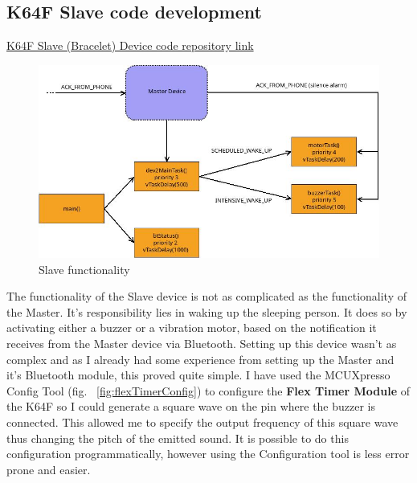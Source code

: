 \documentclass[12pt,a4paper]{article}
\begin{document}
   \subsection{K64F Slave code development}
   \href{https://github.com/zedd-1983/project_dev2/tree/Bluetooth}{K64F Slave (Bracelet) Device code repository link}\\
   
   
   \begin{figure}[h]
    \centering
    \includegraphics[width=\textwidth]{dev2_functionality.jpg}
    \caption{Slave functionality}
    \label{fig:dev2Func}
   \end{figure}
   
   The functionality of the Slave device is not as complicated as the functionality of the Master. It's responsibility lies in waking up the sleeping person. It does so by activating either a buzzer or a vibration motor, based on the notification it receives from the Master device via Bluetooth. 
   Setting up this device wasn't as complex and as I already had some experience from setting up the Master and it's Bluetooth module, this proved quite simple. I have used the MCUXpresso Config Tool (fig. ~\ref{fig:flexTimerConfig}) to configure the {\bfseries Flex Timer Module} of the K64F so I could generate a square wave on the pin where the buzzer is connected. This allowed me to specify the output frequency of this square wave thus changing the pitch of the emitted sound. It is possible to do this configuration programmatically, however using the Configuration tool is less error prone and easier.
   
\end{document}
